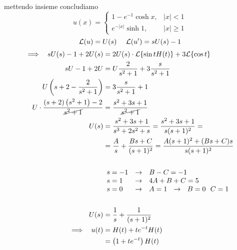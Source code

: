 mettendo insieme concludiamo
\begin{equation*}
u(x) =
\begin{cases}
1 - e^{- 1}\cosh x, & | x| < 1\\
e^{- | x|}\sinh 1, & | x| \geq 1
\end{cases}
\end{equation*}
\Soluzione
\begin{equation*}
\mathcal{L}(u) = U(s) \ \ \ \ \mathcal{L}(u') = sU(s) - 1
\end{equation*}
\begin{align*}
\implies \ \ sU(s) - 1 + 2U(s) & = 2U(s) \cdot \mathcal{L}\{\sin tH(t)\} + 3\mathcal{L}\{\cos t\}\\
sU - 1 + 2U & = U\frac{2}{s^{2} + 1} + 3\frac{s}{s^{2} + 1}\\
U\left(s + 2 - \frac{2}{s^{2} + 1}\right) & = 3\frac{s}{s^{2} + 1} + 1\\
U \cdot \frac{(s + 2)\left(s^{2} + 1\right) - 2}{\cancel{s^{2} + 1}} & = \frac{s^{2} + 3s + 1}{\cancel{s^{2} + 1}}\\
U(s) & = \frac{s^{2} + 3s + 1}{s^{3} + 2s^{2} + s} = \frac{s^{2} + 3s + 1}{s(s + 1)^{2}} = \\
 & = \frac{A}{s} + \frac{Bs + C}{(s + 1)^{2}} = \frac{A(s + 1)^{2} + (Bs + C) s}{s(s + 1)^{2}}\\
 & \\
 &
\begin{array}{l c l}
s = -1 & \rightarrow & B - C = -1\\
s = 1 & \rightarrow & 4A + B + C = 5\\
s = 0 & \rightarrow & A = 1\ \ \rightarrow \ \ B = 0\ \ C = 1
\end{array}\\
 & \ \ \ \ \\
U(s) & = \frac{1}{s} + \frac{1}{(s + 1)^{2}}\\
\implies \ \ u(t) & = H(t) + te^{- t} H(t)\\
 & = \left(1 + te^{- t}\right) H(t)
\end{align*}
\Soluzione

